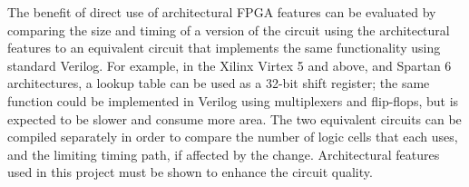 The benefit of direct use of architectural FPGA features can be evaluated by comparing the size and timing of a version of the circuit using the architectural features to an equivalent circuit that implements the same functionality using standard Verilog.
For example, in the Xilinx Virtex 5 and above, and Spartan 6 architectures, a lookup table can be used as a 32-bit shift register; the same function could be implemented in Verilog using multiplexers and flip-flops, but is expected to be slower and consume more area.
The two equivalent circuits can be compiled separately in order to compare the number of logic cells that each uses, and the limiting timing path, if affected by the change.
Architectural features used in this project must be shown to enhance the circuit quality.


